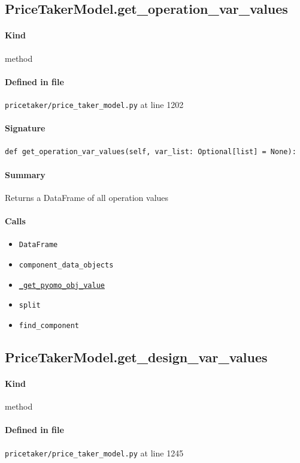 \documentclass[11pt]{report}
\begin{document}
\subsection{PriceTakerModel.get\_operation\_var\_values}
\label{def:pricetaker-price_taker_model.py:PriceTakerModel.get_operation_var_values:L1202}
\paragraph{Kind} method
\paragraph{Defined in file} \texttt{pricetaker/price\_taker\_model.py} at line 1202
\paragraph{Signature} \texttt{def get\_operation\_var\_values(self, var\_list: Optional[list] = None):}
\paragraph{Summary} Returns a DataFrame of all operation values
\paragraph{Calls}
\begin{itemize}[leftmargin=*]
  \item \texttt{DataFrame}
  \item \texttt{component\_data\_objects}
  \item \hyperref[def:pricetaker-price_taker_model.py:PriceTakerModel._get_pyomo_obj_value:L1191]{\texttt{\_get\_pyomo\_obj\_value}}
  \item \texttt{split}
  \item \texttt{find\_component}
\end{itemize}
\subsection{PriceTakerModel.get\_design\_var\_values}
\label{def:pricetaker-price_taker_model.py:PriceTakerModel.get_design_var_values:L1245}
\paragraph{Kind} method
\paragraph{Defined in file} \texttt{pricetaker/price\_taker\_model.py} at line 1245
\end{document}
